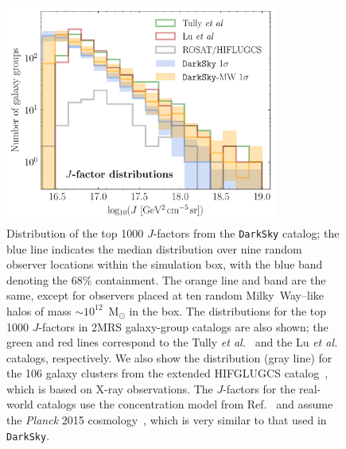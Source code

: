 \begin{figure}[t]
   \centering
   \includegraphics[width=0.8\textwidth]{ch-darksky/plots//cat_jfactors.pdf} 
   \caption{Distribution of the top 1000 $J$-factors from the \texttt{DarkSky} catalog; the blue line  indicates the median distribution over nine random observer locations within the simulation box, with the blue band denoting the 68\% containment.  The orange line and band are the same, except for observers placed at ten random Milky~Way--like halos of mass  $\sim10^{12}$~M$_\odot$ in the box.  The distributions for the top 1000 $J$-factors in 2MRS galaxy-group catalogs are also shown; the green and red lines correspond to the Tully \emph{et al.}~\cite{Tully:2015opa,2017ApJ...843...16K} and the Lu \emph{et al.}~\cite{Lu:2016vmu} catalogs, respectively.  We also show the distribution (gray line) for the 106 galaxy clusters from the extended HIFGLUGCS catalog~\cite{Reiprich:2001zv,Chen:2007sz}, which is based on X-ray observations.  
   The $J$-factors for the real-world catalogs use the concentration model from Ref.~\cite{Correa:2015dva} and assume the \emph{Planck} 2015 cosmology~\cite{Ade:2015xua}, which is very similar to that used in \texttt{DarkSky}.
   }
   \label{fig:GroupCats}
\end{figure}

